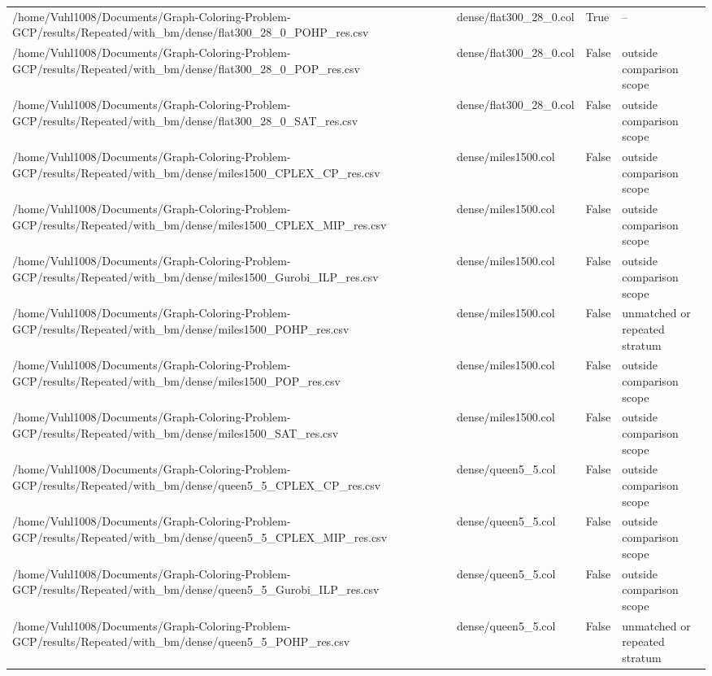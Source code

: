 \begin{table}[htbp]
\begin{tabular}{llll}
/home/Vuhl1008/Documents/Graph-Coloring-Problem-GCP/results/Repeated/with\_bm/dense/flat300\_28\_0\_POHP\_res.csv & dense/flat300\_28\_0.col & True & -- \\
/home/Vuhl1008/Documents/Graph-Coloring-Problem-GCP/results/Repeated/with\_bm/dense/flat300\_28\_0\_POP\_res.csv & dense/flat300\_28\_0.col & False & outside comparison scope \\
/home/Vuhl1008/Documents/Graph-Coloring-Problem-GCP/results/Repeated/with\_bm/dense/flat300\_28\_0\_SAT\_res.csv & dense/flat300\_28\_0.col & False & outside comparison scope \\
/home/Vuhl1008/Documents/Graph-Coloring-Problem-GCP/results/Repeated/with\_bm/dense/miles1500\_CPLEX\_CP\_res.csv & dense/miles1500.col & False & outside comparison scope \\
/home/Vuhl1008/Documents/Graph-Coloring-Problem-GCP/results/Repeated/with\_bm/dense/miles1500\_CPLEX\_MIP\_res.csv & dense/miles1500.col & False & outside comparison scope \\
/home/Vuhl1008/Documents/Graph-Coloring-Problem-GCP/results/Repeated/with\_bm/dense/miles1500\_Gurobi\_ILP\_res.csv & dense/miles1500.col & False & outside comparison scope \\
/home/Vuhl1008/Documents/Graph-Coloring-Problem-GCP/results/Repeated/with\_bm/dense/miles1500\_POHP\_res.csv & dense/miles1500.col & False & unmatched or repeated stratum \\
/home/Vuhl1008/Documents/Graph-Coloring-Problem-GCP/results/Repeated/with\_bm/dense/miles1500\_POP\_res.csv & dense/miles1500.col & False & outside comparison scope \\
/home/Vuhl1008/Documents/Graph-Coloring-Problem-GCP/results/Repeated/with\_bm/dense/miles1500\_SAT\_res.csv & dense/miles1500.col & False & outside comparison scope \\
/home/Vuhl1008/Documents/Graph-Coloring-Problem-GCP/results/Repeated/with\_bm/dense/queen5\_5\_CPLEX\_CP\_res.csv & dense/queen5\_5.col & False & outside comparison scope \\
/home/Vuhl1008/Documents/Graph-Coloring-Problem-GCP/results/Repeated/with\_bm/dense/queen5\_5\_CPLEX\_MIP\_res.csv & dense/queen5\_5.col & False & outside comparison scope \\
/home/Vuhl1008/Documents/Graph-Coloring-Problem-GCP/results/Repeated/with\_bm/dense/queen5\_5\_Gurobi\_ILP\_res.csv & dense/queen5\_5.col & False & outside comparison scope \\
/home/Vuhl1008/Documents/Graph-Coloring-Problem-GCP/results/Repeated/with\_bm/dense/queen5\_5\_POHP\_res.csv & dense/queen5\_5.col & False & unmatched or repeated stratum \\

\end{tabular}
\end{table}

